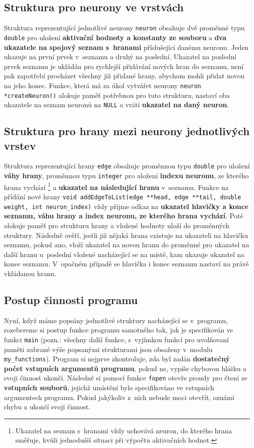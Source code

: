 \documentclass[11pt]{article}
\begin{document}
\subsection{Struktura pro neurony ve vrstvách}
Struktura reprezentující jednotlivé neurony \texttt{neuron} obsahuje dvě proměnné typu \texttt{double} pro uložení \textbf{aktivační hodnoty a konstanty ze souboru} a \textbf{dva ukazatele na spojový seznam s~hranami} příslušející danému neuronu. Jeden ukazuje na první prvek v~seznamu a druhý na poslední. Ukazatel na poslední prvek seznamu je ukládán pro rychlejší přidávání nových hran do seznamu, není pak zapotřebí procházet všechny již přidané hrany, abychom mohli přidat novou na jeho konec. Funkce, která má za úkol vytvářet neurony \texttt{neuron *createNeuron()} alokuje paměť potřebnou pro tuto strukturu, nastaví oba ukazatele na seznam neuronů na \texttt{NULL} a vrátí \textbf{ukazatel na daný neuron}.

\subsection{Struktura pro hrany mezi neurony jednotlivých vrstev}
Struktura reprezentující hrany \texttt{edge} obsahuje proměnnou typu \texttt{double} pro uložení \textbf{váhy hrany}, proměnnou typu \texttt{integer} pro uložení \textbf{indexu neuronu}, ze kterého hrana vychází \footnote{Ukazatel na seznam s~hranami vždy uchovává neuron, do kterého hrana směřuje, kvůli jednodušší situaci při výpočtu aktivačních hodnot.} a \textbf{ukazatel na následující hranu} v~seznamu. Funkce na přídání nové hrany \texttt{void addEdgeToList(edge **head, edge **tail, double weight, int neuron\_index)} vždy přijme odkaz na \textbf{ukazatel hlavičky a konce seznamu, váhu hrany a index neuronu, ze kterého hrana vychází}. Poté alokuje paměť pro strukturu hrany a vložené hodnoty uloží do proměnných struktury. Následně ověří, jestli již nějaká hrana existuje na ukazateli na hlavičku seznamu, pokud ano, vloží ukazatel na novou hranu do proměnné pro ukazatel na další hranu u~poslední vložené nacházející se na místě, kam ukazuje ukazatel na konec seznamu. V~opačném případě se hlavička i konec seznamu nastaví na právě vkládanou hranu.

\subsection{Postup činnosti programu}
Nyní, když máme popsány jednotlivé struktury nacházející se v~programu, rozebereme si postup funkce programu samotného tak, jak je specifikován ve funkci \texttt{main} (pozn.: všechny další funkce, s~vyjímkou funkcí pro uvolňovaní paměti zabrané výše popsanými strukturami jsou obsaženy v~modulu \texttt{my\_functions}). Program si nejprve zkontroluje, zda byl zadán \textbf{dostatečný počet vstupních argumentů programu}, pokud ne, vypíše chybovou hlášku a svoji činnost ukončí. Následně si pomocí funkce \texttt{fopen} otevře proudy pro čtení ze \textbf{vstupních souborů}, jejichž umístění bylo specifikováno ve vstupních argumentech programu. Pokud jakýkoliv z~nich nebude moci otevřít, oznámí chybu a ukončí svoji činnost.
\end{document}
